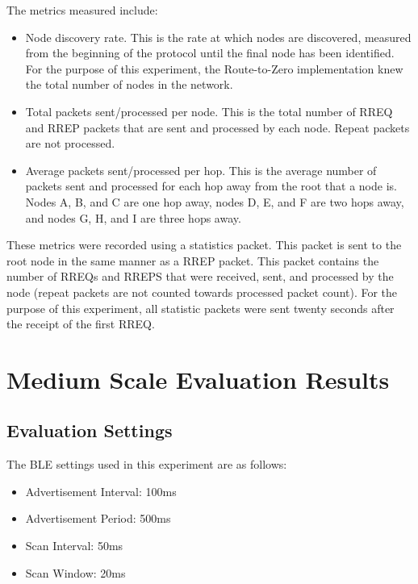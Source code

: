     The metrics measured include:
    \begin{itemize}
      \item Node discovery rate.
            This is the rate at which nodes are discovered, measured from the
            beginning of the protocol until the final node has been identified.
            For the purpose of this experiment, the Route-to-Zero implementation
            knew the total number of nodes in the network.
      \item Total packets sent/processed per node.
            This is the total number of RREQ and RREP packets that are sent
            and processed by each node. Repeat packets are not processed.
      \item Average packets sent/processed per hop.
            This is the average number of packets sent and processed for each hop
            away from the root that a node is. Nodes A, B, and C are one hop away, nodes
            D, E, and F are two hops away, and nodes G, H, and I are three hops away.
    \end{itemize}

    These metrics were recorded using a statistics packet. This packet is sent
    to the root node in the same manner as a RREP packet. This packet contains
    the number of RREQs and RREPS that were received, sent, and processed by
    the node (repeat packets are not counted towards processed packet count).
    For the purpose of this experiment, all statistic packets were sent twenty
    seconds after the receipt of the first RREQ.

    \section{Medium Scale Evaluation Results}

    \subsection{Evaluation Settings}
    The BLE settings used in this experiment are as follows:
    \begin{itemize}
      \item Advertisement Interval: 100ms
      \item Advertisement Period: 500ms
      \item Scan Interval: 50ms
      \item Scan Window: 20ms
    \end{itemize}

